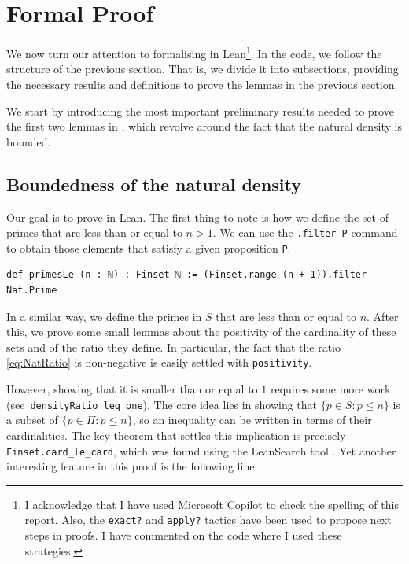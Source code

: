 \documentclass[a4paper,11pt]{article}
\theoremstyle{plain}
\begin{document}
	\section{Formal Proof}\label{sec:formal}

	We now turn our attention to formalising  in Lean\footnote{I acknowledge that I have used Microsoft Copilot to check the spelling of this report. Also, the \lstinline|exact?| and \lstinline|apply?| tactics have been used to propose next steps in proofs. I have commented on the code where I used these strategies.}. In the code, we follow the structure of the previous section. That is, we divide it into subsections, providing the necessary results and definitions to prove the lemmas in the previous section.

	We start by introducing the most important preliminary results needed to prove the first two lemmas in , which revolve around the fact that the natural density is bounded.

	\subsection{Boundedness of the natural density}

	Our goal is to prove  in Lean. The first thing to note is how we define the set of primes that are less than or equal to $n>1$. We can use the \lstinline|.filter P| command to obtain those elements that satisfy a given proposition \lstinline|P|.\\

	\begin{lstlisting}[caption={Definition of $\{p\in \Pi: p \leq n\}$.}, label={list:1}]
	def primesLe (n : ℕ) : Finset ℕ := (Finset.range (n + 1)).filter Nat.Prime
	\end{lstlisting}
    In a similar way, we define the primes in $S$ that are less than or equal to $n$. After this, we prove some small lemmas about the positivity of the cardinality of these sets and of the ratio they define. In particular, the fact that the ratio \eqref{eq:NatRatio} is non-negative is easily settled with \lstinline|positivity|. 

    However, showing that it is smaller than or equal to $1$ requires some more work \mbox{(see \lstinline|densityRatio_leq_one|)}. The core idea lies in showing that $\{p\in S: p \leq n\}$ is a subset of $\{p\in \Pi: p \leq n\}$, so an inequality can be written in terms of their cardinalities. The key theorem that settles this implication is precisely \lstinline|Finset.card_le_card|, which was found using the LeanSearch tool \cite{LeanSearch}. Yet another interesting feature in this proof is the following line:\\
\end{document}
